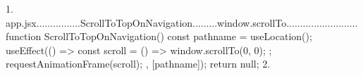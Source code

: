 
1. app.jsx................ScrollToTopOnNavigation.........window.scrollTo..........................
  function ScrollToTopOnNavigation() {
    const { pathname } = useLocation();
    useEffect(() => {
      const scroll = () => {
        window.scrollTo(0, 0);
      };
      requestAnimationFrame(scroll);
    }, [pathname]);
    return null;
  }
2.
